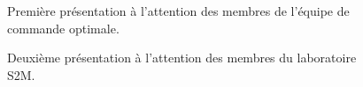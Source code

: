 \begin{appendix}
\begin{center}
\label{s2m1}

\vspace{-0.6cm}
\begin{figure}[h]
\caption{Première présentation à l'attention des membres de l'équipe de commande optimale.}
\end{figure}
\end{center}

\begin{center}
\label{s2m2}

\vspace{-0.6cm}
\begin{figure}[h]
\caption{Deuxième présentation à l'attention des membres du laboratoire S2M.}
\end{figure}
\end{center}


\end{appendix}
